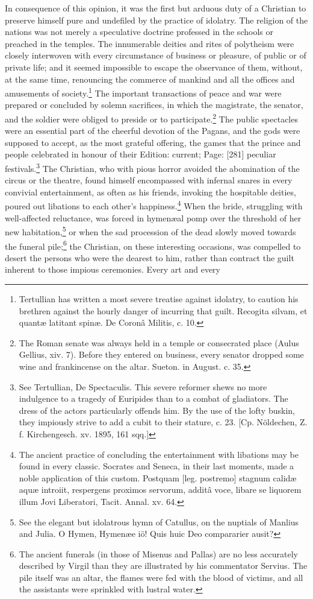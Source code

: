 In consequence of this opinion, it was the first but arduous duty of a Christian to preserve himself pure and undefiled by the practice of idolatry. The religion of the nations was not merely a speculative doctrine professed in the schools or preached in the temples. The innumerable deities and rites of polytheism were closely interwoven with every circumstance of business or pleasure, of public or of private life; and it seemed impossible to escape the observance of them, without, at the same time, renouncing the commerce of mankind and all the offices and amusements of society.\footnote{Tertullian has written a most severe treatise against idolatry, to caution his brethren against the hourly danger of incurring that guilt. Recogita silvam, et quantæ latitant spinæ. De Coronâ Militis, c. 10.} The important transactions of peace and war were prepared or concluded by solemn sacrifices, in which the magistrate, the senator, and the soldier were obliged to preside or to participate.\footnote{The Roman senate was always held in a temple or consecrated place (Aulus Gellius, xiv. 7). Before they entered on business, every senator dropped some wine and frankincense on the altar. Sueton. in August. c. 35.} The public spectacles were an essential part of the cheerful devotion of the Pagans, and the gods were supposed to accept, as the most grateful offering, the games that the prince and people celebrated in honour of their Edition: current; Page: [281] peculiar festivals.\footnote{See Tertullian, De Spectaculis. This severe reformer shews no more indulgence to a tragedy of Euripides than to a combat of gladiators. The dress of the actors particularly offends him. By the use of the lofty buskin, they impiously strive to add a cubit to their stature, c. 23. [Cp. Nöldechen, Z. f. Kirchengesch. xv. 1895, 161 sqq.]} The Christian, who with pious horror avoided the abomination of the circus or the theatre, found himself encompassed with infernal snares in every convivial entertainment, as often as his friends, invoking the hospitable deities, poured out libations to each other\texthebrew{}’s happiness.\footnote{The ancient practice of concluding the entertainment with libations may be found in every classic. Socrates and Seneca, in their last moments, made a noble application of this custom. Postquam [leg. postremo] stagnum calidæ aquæ introiit, respergens proximos servorum, additâ voce, libare se liquorem illum Jovi Liberatori, Tacit. Annal. xv. 64.} When the bride, struggling with well-affected reluctance, was forced in hymenæal pomp over the threshold of her new habitation,\footnote{See the elegant but idolatrous hymn of Catullus, on the nuptials of Manlius and Julia. O Hymen, Hymenæe iö! Quis huic Deo compararier ausit?} or when the sad procession of the dead slowly moved towards the funeral pile;\footnote{The ancient funerals (in those of Misenus and Pallas) are no less accurately described by Virgil than they are illustrated by his commentator Servius. The pile itself was an altar, the flames were fed with the blood of victims, and all the assistants were sprinkled with lustral water.} the Christian, on these interesting occasions, was compelled to desert the persons who were the dearest to him, rather than contract the guilt inherent to those impious ceremonies. Every art and every 